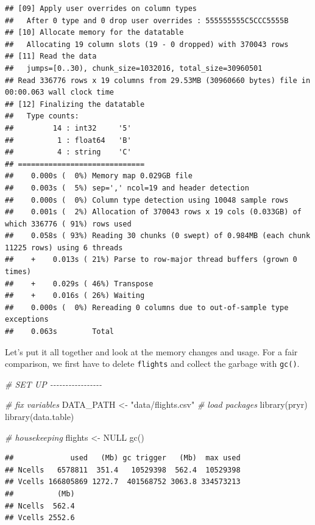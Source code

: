 \documentclass[
  12pt,
]{style/krantz}
\newenvironment{Shaded}{\begin{snugshade}}{\end{snugshade}}
\newcommand{\CommentTok}[1]{\textcolor[rgb]{0.56,0.35,0.01}{\textit{#1}}}
\newcommand{\ConstantTok}[1]{\textcolor[rgb]{0.00,0.00,0.00}{#1}}
\newcommand{\FunctionTok}[1]{\textcolor[rgb]{0.00,0.00,0.00}{#1}}
\newcommand{\NormalTok}[1]{#1}
\newcommand{\OtherTok}[1]{\textcolor[rgb]{0.56,0.35,0.01}{#1}}
\newcommand{\StringTok}[1]{\textcolor[rgb]{0.31,0.60,0.02}{#1}}
\begin{document}
\begin{verbatim}
## [09] Apply user overrides on column types
##   After 0 type and 0 drop user overrides : 555555555C5CCC5555B
## [10] Allocate memory for the datatable
##   Allocating 19 column slots (19 - 0 dropped) with 370043 rows
## [11] Read the data
##   jumps=[0..30), chunk_size=1032016, total_size=30960501
## Read 336776 rows x 19 columns from 29.53MB (30960660 bytes) file in 00:00.063 wall clock time
## [12] Finalizing the datatable
##   Type counts:
##         14 : int32     '5'
##          1 : float64   'B'
##          4 : string    'C'
## =============================
##    0.000s (  0%) Memory map 0.029GB file
##    0.003s (  5%) sep=',' ncol=19 and header detection
##    0.000s (  0%) Column type detection using 10048 sample rows
##    0.001s (  2%) Allocation of 370043 rows x 19 cols (0.033GB) of which 336776 ( 91%) rows used
##    0.058s ( 93%) Reading 30 chunks (0 swept) of 0.984MB (each chunk 11225 rows) using 6 threads
##    +    0.013s ( 21%) Parse to row-major thread buffers (grown 0 times)
##    +    0.029s ( 46%) Transpose
##    +    0.016s ( 26%) Waiting
##    0.000s (  0%) Rereading 0 columns due to out-of-sample type exceptions
##    0.063s        Total
\end{verbatim}

Let's put it all together and look at the memory changes and usage. For a fair comparison, we first have to delete \texttt{flights} and collect the garbage with \texttt{gc()}.

\begin{Shaded}
\begin{Highlighting}[]
\CommentTok{\# SET UP {-}{-}{-}{-}{-}{-}{-}{-}{-}{-}{-}{-}{-}{-}{-}{-}{-}}

\CommentTok{\# fix variables}
\NormalTok{DATA\_PATH }\OtherTok{\textless{}{-}} \StringTok{"data/flights.csv"}
\CommentTok{\# load packages}
\FunctionTok{library}\NormalTok{(pryr) }
\FunctionTok{library}\NormalTok{(data.table)}

\CommentTok{\# housekeeping}
\NormalTok{flights }\OtherTok{\textless{}{-}} \ConstantTok{NULL}
\FunctionTok{gc}\NormalTok{()}
\end{Highlighting}
\end{Shaded}

\begin{verbatim}
##             used   (Mb) gc trigger   (Mb)  max used
## Ncells   6578811  351.4   10529398  562.4  10529398
## Vcells 166805869 1272.7  401568752 3063.8 334573213
##          (Mb)
## Ncells  562.4
## Vcells 2552.6
\end{verbatim}
\end{document}
